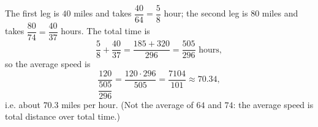 The first leg is $40$ miles and takes $\dfrac{40}{64}=\dfrac{5}{8}$ hour; the second leg is $80$ miles and takes $\dfrac{80}{74}=\dfrac{40}{37}$ hours. The total time is
\[
\dfrac{5}{8}+\dfrac{40}{37}=\dfrac{185+320}{296}=\dfrac{505}{296}\text{ hours},
\]
so the average speed is
\[
\dfrac{120}{\dfrac{505}{296}}=\dfrac{120\cdot296}{505}=\dfrac{7104}{101}\approx70.34,
\]
i.e. about $\boxed{70.3}$ miles per hour. (Not the average of $64$ and $74$: the average speed is total distance over total time.)
